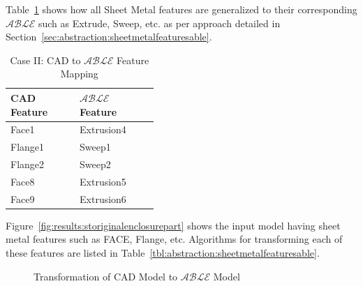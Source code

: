 
Table~\ref{tbl:results:cadablemapstapler} shows how all Sheet Metal features are generalized to their corresponding $\mathcal{ABLE}$ such as Extrude, Sweep, etc. as per approach detailed in Section~\ref{sec:abstraction:sheetmetalfeaturesable}.


\begin{table}[!h]
\centering
\caption{Case II: CAD to $\mathcal{ABLE}$ Feature Mapping}
\label{tbl:results:cadablemapstapler}
\begin{tabular}[h]{@{} p{0.21\linewidth} p{0.21\linewidth} @{}}
\toprule
{\bf CAD Feature } & {$\mathcal{ABLE}$ Feature}\\ \midrule
Face1 & Extrusion4\\
Flange1 & Sweep1\\
Flange2 & Sweep2 \\
Face8 & Extrusion5\\
Face9 & Extrusion6\\
\bottomrule
\end{tabular}

\end{table}


Figure~\ref{fig:results:storiginalenclosurepart} shows the input model having sheet metal features such as FACE, Flange, etc.  Algorithms for transforming each of these features are listed in Table~\ref{tbl:abstraction:sheetmetalfeaturesable}.


\begin{figure}[!h]
\centering     %
{} \quad
{} 
\caption{Transformation of CAD Model to $\mathcal{ABLE}$ Model}
\label{fig:results:stable}
\end{figure}

